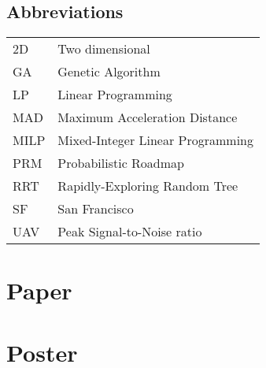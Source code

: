 \documentclass[
master=cws,
masteroption=ai,
english,
]{kulemt}
\begin{document}
\section*{Abbreviations}
\begin{flushleft}
  \renewcommand{\arraystretch}{1.1}
  \begin{tabularx}{\textwidth}{@{}p{12mm}X@{}}
    2D   & Two dimensional \\
    GA   & Genetic Algorithm \\
    LP   & Linear Programming \\
    MAD   & Maximum Acceleration Distance \\
    MILP   & Mixed-Integer Linear Programming \\
    PRM   & Probabilistic Roadmap \\
    RRT   & Rapidly-Exploring Random Tree \\
    SF   & San Francisco \\
    UAV  & Peak Signal-to-Noise ratio \\
  \end{tabularx}
\end{flushleft}

\mainmatter

\clearpage

\clearpage

\clearpage

\clearpage

\clearpage

\clearpage
%

\clearpage

\appendixpage*
\appendix
\chapter{Paper}

\chapter{Poster}


\backmatter



\end{document}
